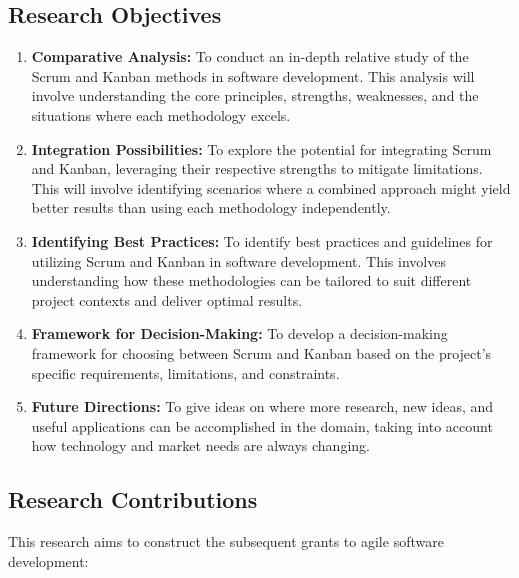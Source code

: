 \documentclass[conference]{IEEEtran}
\begin{document}
\subsection{Research Objectives}
\begin{enumerate}
  \item \textbf{Comparative Analysis:} To conduct an in-depth relative study of the Scrum and Kanban methods in software development. This analysis will involve understanding the core principles, strengths, weaknesses, and the situations where each methodology excels.

  \item \textbf{Integration Possibilities:} To explore the potential for integrating Scrum and Kanban, leveraging their respective strengths to mitigate limitations. This will involve identifying scenarios where a combined approach might yield better results than using each methodology independently.

  \item \textbf{Identifying Best Practices:} To identify best practices and guidelines for utilizing Scrum and Kanban in software development. This involves understanding how these methodologies can be tailored to suit different project contexts and deliver optimal results.

  \item \textbf{Framework for Decision-Making:} To develop a decision-making framework for choosing between Scrum and Kanban based on the project's specific requirements, limitations, and constraints.

  \item \textbf{Future Directions:} To give ideas on where more research, new ideas, and useful applications can be accomplished in the domain, taking into account how technology and market needs are always changing.
\end{enumerate}

\subsection{Research Contributions}
This research aims to construct the subsequent grants to agile software development:
\end{document}
